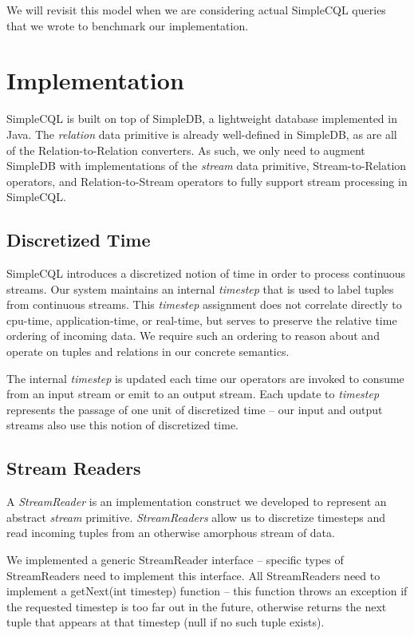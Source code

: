 \documentclass[a4paper, 10pt, conference]{IEEEconf}
\begin{document}
We will revisit this model when we are considering actual SimpleCQL queries that we wrote to benchmark our implementation.


\section{Implementation}
SimpleCQL is built on top of SimpleDB, a lightweight database implemented in Java. The \textit{relation} data primitive is already well-defined in SimpleDB, as are all of the Relation-to-Relation converters. As such, we only need to augment SimpleDB with implementations of the \textit{stream} data primitive, Stream-to-Relation operators, and Relation-to-Stream operators to fully support stream processing in SimpleCQL. 

\subsection*{Discretized Time}
SimpleCQL introduces a discretized notion of time in order to process continuous streams. Our system maintains an internal \textit{timestep} that is used to label tuples from continuous streams. This \textit{timestep} assignment does not correlate directly to cpu-time, application-time, or real-time, but serves to preserve the relative time ordering of incoming data. We require such an ordering to reason about and operate on tuples and relations in our concrete semantics.

The internal \textit{timestep} is updated each time our operators are invoked to consume from an input stream or emit to an output stream. Each update to \textit{timestep} represents the passage of one unit of discretized time -- our input and output streams also use this notion of discretized time. 

\subsection{Stream Readers}
A \textit{StreamReader} is an implementation construct we developed to represent an abstract \textit{stream} primitive. \textit{StreamReaders} allow us to discretize timesteps and read incoming tuples from an otherwise amorphous stream of data.

We implemented a generic StreamReader interface -- specific types of StreamReaders need to implement this interface. All StreamReaders need to implement a getNext(int timestep) function -- this function throws an exception if the requested timestep is too far out in the future, otherwise returns the next tuple that appears at that timestep (null if no such tuple exists).
\end{document}
